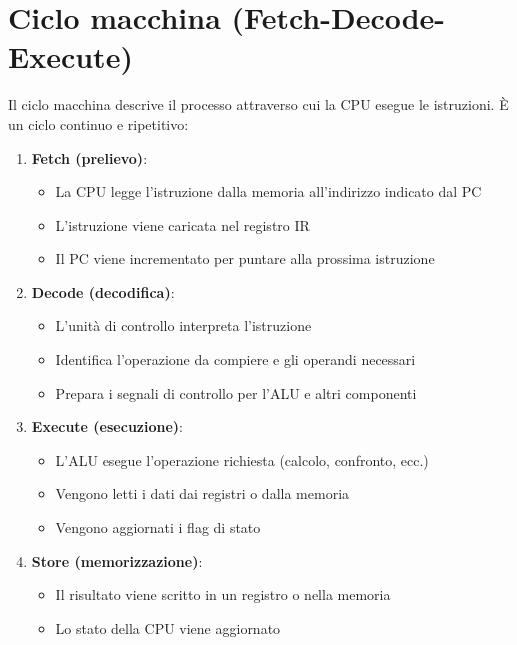 \documentclass[12pt,a4paper]{article}
\begin{document}
\section{Ciclo macchina (Fetch-Decode-Execute)}
Il ciclo macchina descrive il processo attraverso cui la CPU esegue le istruzioni. È un ciclo continuo e ripetitivo:

\begin{enumerate}
    \item \textbf{Fetch (prelievo)}: 
    \begin{itemize}
        \item La CPU legge l'istruzione dalla memoria all'indirizzo indicato dal PC
        \item L'istruzione viene caricata nel registro IR
        \item Il PC viene incrementato per puntare alla prossima istruzione
    \end{itemize}
    
    \item \textbf{Decode (decodifica)}: 
    \begin{itemize}
        \item L'unità di controllo interpreta l'istruzione
        \item Identifica l'operazione da compiere e gli operandi necessari
        \item Prepara i segnali di controllo per l'ALU e altri componenti
    \end{itemize}
    
    \item \textbf{Execute (esecuzione)}: 
    \begin{itemize}
        \item L'ALU esegue l'operazione richiesta (calcolo, confronto, ecc.)
        \item Vengono letti i dati dai registri o dalla memoria
        \item Vengono aggiornati i flag di stato
    \end{itemize}
    
    \item \textbf{Store (memorizzazione)}: 
    \begin{itemize}
        \item Il risultato viene scritto in un registro o nella memoria
        \item Lo stato della CPU viene aggiornato
    \end{itemize}
\end{enumerate}
\end{document}
